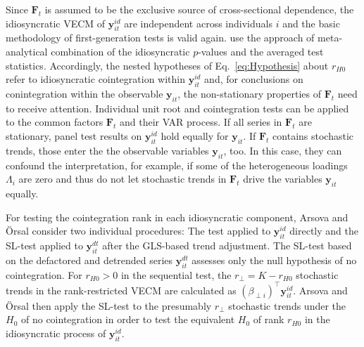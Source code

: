 Since $ \boldsymbol{F}_t $ is assumed to be the exclusive source of cross-sectional dependence, the idiosyncratic VECM of $ \boldsymbol{y}^{i \! d}_{it} $ are independent across individuals $ i $ and the basic methodology of first-generation tests is valid again. \citet{ArsovaOersal2017} use the approach of meta-analytical combination of the idiosyncratic $p$-values and \citet{ArsovaOersal2018} the averaged test statistics. Accordingly, the nested hypotheses of Eq.~\eqref{eq:Hypothesis} about $ r_{H0} $ refer to idiosyncratic cointegration within $ \boldsymbol{y}^{i \! d}_{it} $ and, for conclusions on conintegration within the observable $ \boldsymbol{y}_{it} $, the non-stationary properties of $ \boldsymbol{F}_t $ need to receive attention. Individual unit root and cointegration tests can be applied to the common factors $ \boldsymbol{F}_t $ and their VAR process. If all series in $ \boldsymbol{F}_t $ are stationary, panel test results on $ \boldsymbol{y}^{i \! d}_{it} $ hold equally for $ \boldsymbol{y}_{it} $. If $ \boldsymbol{F}_t $ contains stochastic trends, those enter the the observable variables $ \boldsymbol{y}_{it} $, too. In this case, they can confound the interpretation, for example, if some of the heterogeneous loadings $ \Lambda_i $ are zero and thus do not let stochastic trends in $ \boldsymbol{F}_t $ drive the variables $ \boldsymbol{y}_{it} $ equally.

For testing the cointegration rank in each idiosyncratic component, Arsova and Örsal \citeyearpar{ArsovaOersal2017,ArsovaOersal2018} consider two individual procedures: The \citeauthor{Johansen1988} test applied to $ \boldsymbol{y}^{i \! d}_{it} $ directly and the SL-test applied to $ \boldsymbol{y}^{d \! t}_{it} $ after the GLS-based trend adjustment. The SL-test based on the defactored and detrended series $ \boldsymbol{y}^{d \! t}_{it} $ assesses only the null hypothesis of no cointegration. For $ r_{H0} > 0 $ in the sequential test, the $ r_\perp = K - r_{H0} $ stochastic trends in the rank-restricted VECM are calculated as $ \left( \beta_{\perp i} \right)^\top \boldsymbol{y}^{i \! d}_{it} $. Arsova and Örsal \citeyearpar{ArsovaOersal2017,ArsovaOersal2018} then apply the SL-test to the presumably $ r_\perp $ stochastic trends under the $ H_0 $ of no cointegration in order to test the equivalent $ H_0 $ of rank $ r_{H0} $ in the idiosyncratic process of $ \boldsymbol{y}^{i \! d}_{it} $. 

